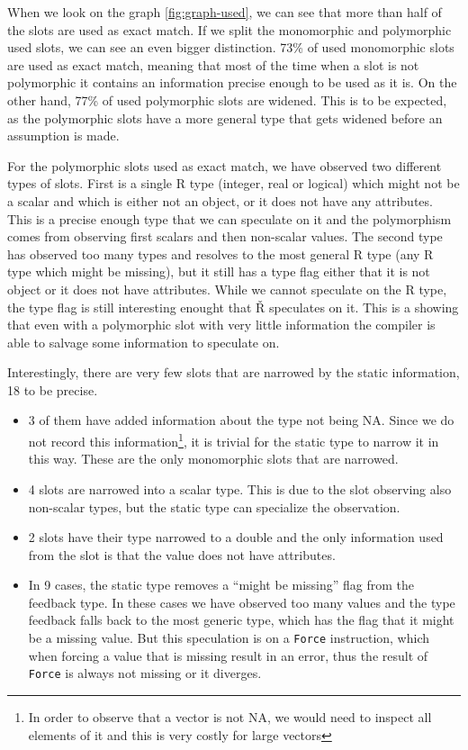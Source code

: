 When we look on the graph \ref{fig:graph-used}, we can see that more than half of the slots are used as exact match. If we split the monomorphic and polymorphic used slots, we can see an even bigger distinction. 73\% of used monomorphic slots are used as exact match, meaning that most of the time when a slot is not polymorphic it contains an information precise enough to be used as it is. On the other hand, 77\% of used polymorphic slots are widened. This is to be expected, as the polymorphic slots have a more general type that gets widened before an assumption is made.

For the polymorphic slots used as exact match, we have observed two different types of slots. First is a single R type (integer, real or logical) which might not be a scalar and which is either not an object, or it does not have any attributes. This is a precise enough type that we can speculate on it and the polymorphism comes from observing first scalars and then non-scalar values. The second type has observed too many types and resolves to the most general R type (any R type which might be missing), but it still has a type flag either that it is not object or it does not have attributes. While we cannot speculate on the R type, the type flag is still interesting enought that Ř speculates on it. This is a showing that even with a polymorphic slot with very little information the compiler is able to salvage some information to speculate on.

Interestingly, there are very few slots that are narrowed by the static information, 18 to be precise.

\begin{itemize}
	\item{} 3 of them have added information about the type not being NA. Since we do not record this information\footnote{In order to observe that a vector is not NA, we would need to inspect all elements of it and this is very costly for large vectors}, it is trivial for the static type to narrow it in this way. These are the only monomorphic slots that are narrowed.
	\item{} 4 slots are narrowed into a scalar type. This is due to the slot observing also non-scalar types, but the static type can specialize the observation.
	\item{} 2 slots have their type narrowed to a double and the only information used from the slot is that the value does not have attributes.
	\item{} In 9 cases, the static type removes a \enquote{might be missing} flag from the feedback type. In these cases we have observed too many values and the type feedback falls back to the most generic type, which has the flag that it might be a missing value. But this speculation is on a \texttt{Force} instruction, which when forcing a value that is missing result in an error, thus the result of \texttt{Force} is always not missing or it diverges.
\end{itemize}


